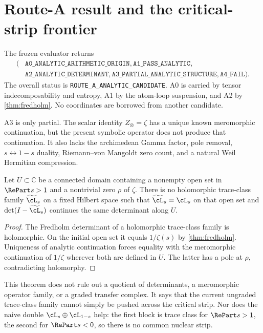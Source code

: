 \section{Route-A result and the critical-strip frontier}

The frozen evaluator returns
\[
\begin{split}
(&\texttt{A0\_ANALYTIC\_ARITHMETIC\_ORIGIN},
\texttt{A1\_PASS\_ANALYTIC},\\
&\texttt{A2\_ANALYTIC\_DETERMINANT},
\texttt{A3\_PARTIAL\_ANALYTIC\_STRUCTURE},
\texttt{A4\_FAIL}).
\end{split}
\]
The overall status is \texttt{ROUTE\_A\_ANALYTIC\_CANDIDATE}.  A0 is carried
by tensor indecomposability and entropy, A1 by the atom-loop suspension, and
A2 by \cref{thm:fredholm}.  No coordinates are borrowed from another
candidate.

A3 is only partial.  The scalar identity $Z_\otimes=\zeta$ has a unique known
meromorphic continuation, but the present symbolic operator does not produce
that continuation.  It also lacks the archimedean Gamma factor, pole
removal, $s\leftrightarrow1-s$ duality, Riemann--von Mangoldt zero count, and
a natural Weil Hermitian compression.

\begin{theorem}
\label{thm:continuation-obstruction}
Let $U\subset\mathbb C$ be a connected domain containing a nonempty open set
in $\RePart s>1$ and a nontrivial zero $\rho$ of $\zeta$.  There is no
holomorphic trace-class family $\widetilde{\cL}_s$ on a fixed Hilbert space
such that $\widetilde{\cL}_s=\cL_s$ on that open set and
$\det(I-\widetilde{\cL}_s)$ continues the same determinant along $U$.
\end{theorem}

\begin{proof}
The Fredholm determinant of a holomorphic trace-class family is holomorphic.
On the initial open set it equals $1/\zeta(s)$ by
\cref{thm:fredholm}.  Uniqueness of analytic continuation forces equality
with the meromorphic continuation of $1/\zeta$ wherever both are defined in
$U$.  The latter has a pole at $\rho$, contradicting holomorphy.
\end{proof}

This theorem does not rule out a quotient of determinants, a meromorphic
operator family, or a graded transfer complex.  It says that the current
ungraded trace-class family cannot simply be pushed across the critical
strip.  Nor does the naive double $\cL_s\oplus\cL_{1-s}$ help: the first block
is trace class for $\RePart s>1$, the second for $\RePart s<0$, so there is no
common nuclear strip.

